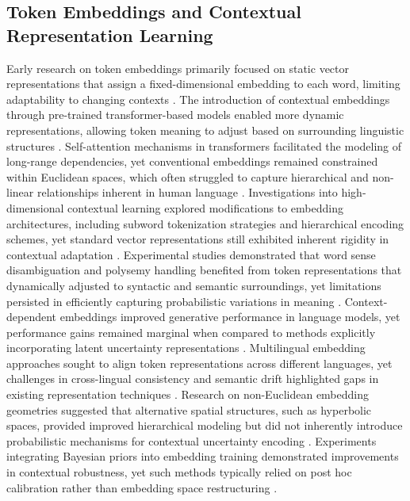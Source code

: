 \documentclass{article}
\begin{document}
\subsection{Token Embeddings and Contextual Representation Learning}
Early research on token embeddings primarily focused on static vector representations that assign a fixed-dimensional embedding to each word, limiting adaptability to changing contexts \cite{nabovina2024neural}. The introduction of contextual embeddings through pre-trained transformer-based models enabled more dynamic representations, allowing token meaning to adjust based on surrounding linguistic structures \cite{nishikado2024mitigating}. Self-attention mechanisms in transformers facilitated the modeling of long-range dependencies, yet conventional embeddings remained constrained within Euclidean spaces, which often struggled to capture hierarchical and non-linear relationships inherent in human language \cite{behore2024enhancing}. Investigations into high-dimensional contextual learning explored modifications to embedding architectures, including subword tokenization strategies and hierarchical encoding schemes, yet standard vector representations still exhibited inherent rigidity in contextual adaptation \cite{wong2024efficiency, fairburn2024mitigate}. Experimental studies demonstrated that word sense disambiguation and polysemy handling benefited from token representations that dynamically adjusted to syntactic and semantic surroundings, yet limitations persisted in efficiently capturing probabilistic variations in meaning \cite{jana2024evolution}. Context-dependent embeddings improved generative performance in language models, yet performance gains remained marginal when compared to methods explicitly incorporating latent uncertainty representations \cite{anderson2024semantic, desrochers2024reducing}. Multilingual embedding approaches sought to align token representations across different languages, yet challenges in cross-lingual consistency and semantic drift highlighted gaps in existing representation techniques \cite{he2024mitigating}. Research on non-Euclidean embedding geometries suggested that alternative spatial structures, such as hyperbolic spaces, provided improved hierarchical modeling but did not inherently introduce probabilistic mechanisms for contextual uncertainty encoding \cite{novado2024multi}. Experiments integrating Bayesian priors into embedding training demonstrated improvements in contextual robustness, yet such methods typically relied on post hoc calibration rather than embedding space restructuring \cite{ga2024evaluating}. 
\end{document}
